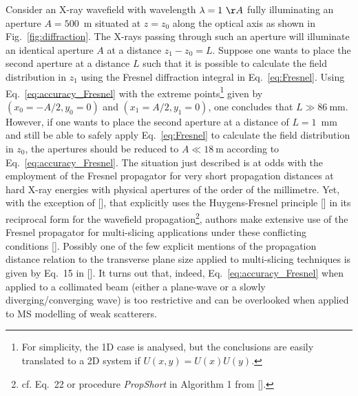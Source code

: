 \begin{refsection}
Consider an X-ray wavefield with wavelength $\lambda=1~\AA$ fully illuminating an aperture $A=500$~\textmu m situated at $z=z_0$ along the optical axis as shown in Fig.~\ref{fig:diffraction}. The X-rays passing through such an aperture will illuminate an identical aperture $A$ at a distance $z_1-z_0=L$. Suppose one wants to place the second aperture at a distance $L$ such that it is possible to calculate the field distribution in $z_1$ using the Fresnel diffraction integral in Eq.~\ref{eq:Fresnel}. Using Eq.~\ref{eq:accuracy_Fresnel} with the extreme points\footnote{For simplicity, the 1D case is analysed, but the conclusions are easily translated to a 2D system if $U(x,y)=U(x)U(y)$.} given by $(x_0=-A/2, y_0=0)$ and $(x_1=A/2, y_1=0)$, one concludes that $ L\gg86~$mm. However, if one wants to place the second aperture at a distance of $L=1$~mm and still be able to safely apply Eq.~\ref{eq:Fresnel} to calculate the field distribution in $z_0$, the apertures should be reduced to $A\ll18~$\textmu m according to Eq.~\ref{eq:accuracy_Fresnel}. The situation just described is at odds with the employment of the Fresnel propagator for very short propagation distances at hard X-ray energies with physical apertures of the order of the millimetre. Yet, with the exception of [\cite{Ali2020}], that explicitly uses the Huygens-Fresnel principle [\cite[\textit{\S3.7}]{Goodman2017}] in its reciprocal form for the wavefield propagation\footnote{cf. Eq.~22 or procedure \textit{PropShort} in Algorithm 1 from [\cite{Ali2020}].}, authors make extensive use of the Fresnel propagator for multi-slicing applications under these conflicting conditions [\cite{Li2017, Munro2019, Celestre2020}]. Possibly one of the few explicit mentions of the propagation distance relation to the transverse plane size applied to multi-slicing techniques is given by Eq.~15 in [\cite{Ishizuka1977}]. It turns out that, indeed, Eq.~\ref{eq:accuracy_Fresnel} when applied to a collimated beam (either a plane-wave or a slowly diverging/converging wave) is too restrictive and can be overlooked when applied to MS modelling of weak scatterers.


\end{refsection}
